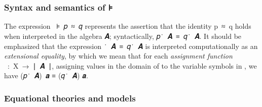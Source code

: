 \begin{code}
\AgdaSymbol{:}\AgdaSpace{}%
\AgdaSymbol{(}\AgdaSpace{}%
\AgdaSpace{}%
\AgdaSymbol{)(}\AgdaSpace{}%
\AgdaSymbol{)}\AgdaSpace{}%
\AgdaSpace{}%
\AgdaSpace{}%
\AgdaSpace{}%
\AgdaSpace{}%
\AgdaSpace{}%
\AgdaSpace{}%
\AgdaSpace{}%
\AgdaSpace{}%
\AgdaSpace{}%
\AgdaSpace{}%
\AgdaSpace{}%
\<%
\\
%
\\[\AgdaEmptyExtraSkip]%
%
\>[1]\AgdaSpace{}%
\AgdaSpace{}%
\AgdaSpace{}%
\AgdaSpace{}%
\AgdaSpace{}%
\AgdaSymbol{=}\AgdaSpace{}%
\AgdaSymbol{\{}\AgdaSpace{}%
\AgdaSymbol{:}\AgdaSpace{}%
\AgdaSpace{}%
\AgdaSymbol{\AgdaUnderscore{}}\AgdaSpace{}%
\AgdaSymbol{\}}\AgdaSpace{}%
\AgdaSpace{}%
\AgdaSpace{}%
\AgdaSpace{}%
\AgdaSpace{}%
\AgdaSpace{}%
\AgdaSpace{}%
\AgdaSpace{}%
\AgdaSpace{}%
\<%
\end{code}

\subsubsection{Syntax and semantics of ⊧}\label{syntax-and-semantics-of}
The expression ~\af ⊧~\ab 𝑝~\af ≈~\ab 𝑞 represents the assertion that the identity \ab p~\af ≈~\ab q holds when interpreted in the algebra \ab 𝑨; syntactically, \ab 𝑝~\af ̇~\ab 𝑨~\ad ≡~\ab 𝑞~\af ̇~\ab 𝑨. It should be emphasized that the expression ~\af ̇~\ab 𝑨~\ad ≡~\ab 𝑞~\af ̇~\ab 𝑨 is interpreted computationally
as an \emph{extensional equality}, by which we mean that for each \emph{assignment function} ~\as :~\ab X~\as →~\af ∣~\ab 𝑨~\af ∣, assigning values in the domain of  to the variable symbols in , we have (\ab 𝑝~\af ̇~\ab 𝑨)~\ab 𝒂 \ad ≡ (\ab 𝑞~\af ̇~\ab 𝑨) \ab 𝒂.

\subsubsection{Equational theories and models}\label{equational-theories-and-models}

